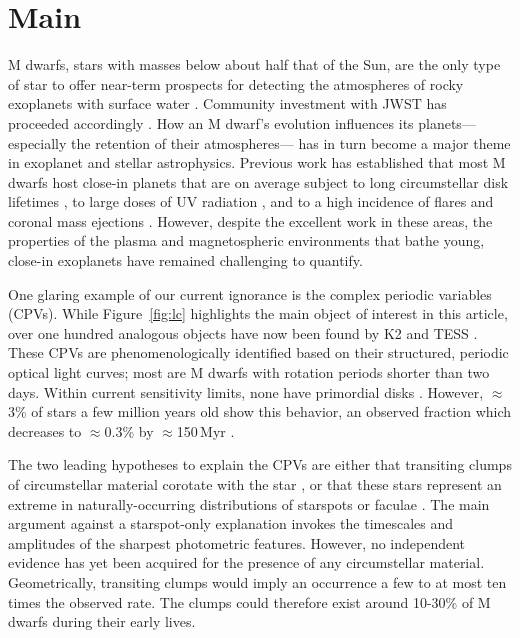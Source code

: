 \documentclass{nature3}
\begin{document}

\section{Main}
\label{sec:main}

M dwarfs, stars with masses below about half that of the Sun, are the
only type of star to offer near-term prospects for detecting the
atmospheres of rocky exoplanets with surface water \cite{NAP26141}.
Community investment with JWST has proceeded accordingly
\cite{Redfield2024,TRAPPIST1JWSTCommunityInitiative2024}.  How an M
dwarf's evolution influences its planets---especially the retention of
their atmospheres--- has in turn become a major theme in
exoplanet and stellar astrophysics.  Previous work has established
that most M dwarfs host close-in planets \cite{Dressing2015} that are
on average subject to long circumstellar disk lifetimes
\cite{Ribas2015}, to large doses of UV radiation \cite{France2013},
and to a high incidence of flares and coronal mass ejections
\cite{Gunther2020}.  However, despite the excellent work in these areas,
the properties of the plasma and magnetospheric environments that
bathe young, close-in exoplanets have remained challenging to
quantify.

One glaring example of our current ignorance is the complex periodic
variables (CPVs).  While Figure~\ref{fig:lc} highlights the main
object of interest in this article, over one hundred analogous objects
have now been found by K2 and TESS
\cite{Rebull2016,Stauffer2017,Rebull2018,Zhan2019,Rebull2020,Bouma2024}.
These CPVs are phenomenologically identified based on their
structured, periodic optical light curves; most are M dwarfs with
rotation periods shorter than two days.  Within current sensitivity
limits, none have primordial disks \cite{Stauffer2017,Bouma2024}.
However, $\approx$3\% of stars a few million years old show this
behavior, an  observed fraction which decreases to $\approx$0.3\% by
$\approx$150\,Myr \cite{Rebull2020}.

The two leading hypotheses to explain the CPVs are either that
transiting clumps of circumstellar material corotate with the star
\cite{Stauffer2017,Gunther2022,Bouma2024}, or that these stars
represent an extreme in naturally-occurring distributions of starspots
or faculae \cite{Koen2021}.  The main argument against a starspot-only
explanation invokes the timescales and amplitudes of the sharpest
photometric features.  However, no independent evidence has yet been
acquired for the presence of any circumstellar material.
Geometrically, transiting clumps would imply an occurrence a few to at
most ten times the observed rate.  The clumps could therefore exist
around 10-30\% of M dwarfs during their early lives.
\end{document}
